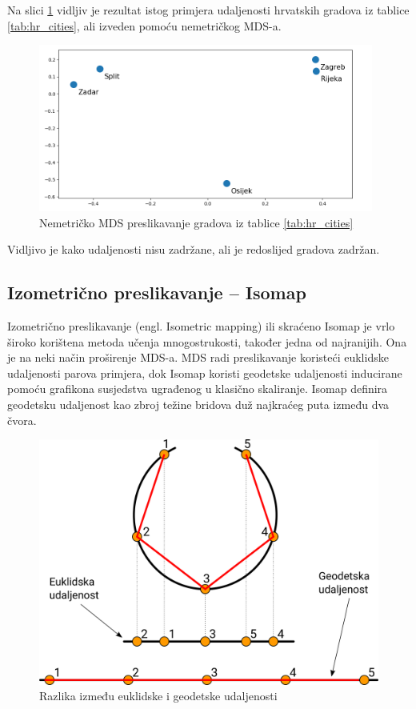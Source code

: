 \documentclass[times, utf8, diplomski]{fer}
\begin{document}
Na slici \ref{fig:mds_mapping_hr_nonmetrc} vidljiv je rezultat istog primjera udaljenosti hrvatskih gradova iz tablice \ref{tab:hr_cities}, ali izveden pomoću nemetričkog MDS-a.

\begin{figure}[htb]
    \centering
    \includegraphics[width=11cm]{resources/images/reduction/mds_mapping_hr_nonmetric.png}
    \caption{Nemetričko MDS preslikavanje gradova iz tablice \ref{tab:hr_cities}}
    \label{fig:mds_mapping_hr_nonmetrc}
\end{figure}
Vidljivo je kako udaljenosti nisu zadržane, ali je redoslijed gradova zadržan.

\subsection{Izometrično preslikavanje -- Isomap}

Izometrično preslikavanje (engl. Isometric mapping) ili skraćeno Isomap je vrlo široko korištena metoda učenja mnogostrukosti, također jedna od najranijih. Ona je na neki način proširenje MDS-a. MDS radi preslikavanje koristeći euklidske udaljenosti parova primjera, dok Isomap koristi geodetske udaljenosti inducirane pomoću grafikona susjedstva ugrađenog u klasično skaliranje. Isomap definira geodetsku udaljenost kao zbroj težine bridova duž najkraćeg puta između dva čvora.

\begin{figure}[htb]
    \centering
    \includegraphics[width=12cm]{resources/images/reduction/euclid_vs_geodetic.png}
    \caption{Razlika između euklidske i geodetske udaljenosti}
    \label{fig:euclid_vs_geodetic}
\end{figure}
\end{document}

